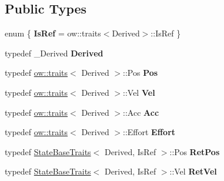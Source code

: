 \subsection*{Public Types}
\begin{DoxyCompactItemize}
\item 
enum \{ {\bfseries Is\+Ref} = ow\+:\+:traits$<$Derived$>$\+:\+:Is\+Ref
 \}\hypertarget{classow__core_1_1StateBase_aebf7bdd308503059430ad3fd25b546e3}{}\label{classow__core_1_1StateBase_aebf7bdd308503059430ad3fd25b546e3}

\item 
typedef \+\_\+\+Derived {\bfseries Derived}\hypertarget{classow__core_1_1StateBase_a7ee88875f85df39f4d6f50bdabda6e25}{}\label{classow__core_1_1StateBase_a7ee88875f85df39f4d6f50bdabda6e25}

\item 
typedef \hyperlink{structow_1_1traits}{ow\+::traits}$<$ Derived $>$\+::Pos {\bfseries Pos}\hypertarget{classow__core_1_1StateBase_aea66b5c23c9391eb5188225c24156c82}{}\label{classow__core_1_1StateBase_aea66b5c23c9391eb5188225c24156c82}

\item 
typedef \hyperlink{structow_1_1traits}{ow\+::traits}$<$ Derived $>$\+::Vel {\bfseries Vel}\hypertarget{classow__core_1_1StateBase_a24e1696806e6418215d232dd25396471}{}\label{classow__core_1_1StateBase_a24e1696806e6418215d232dd25396471}

\item 
typedef \hyperlink{structow_1_1traits}{ow\+::traits}$<$ Derived $>$\+::Acc {\bfseries Acc}\hypertarget{classow__core_1_1StateBase_a1f00d5b78734089abee4367c4bb68567}{}\label{classow__core_1_1StateBase_a1f00d5b78734089abee4367c4bb68567}

\item 
typedef \hyperlink{structow_1_1traits}{ow\+::traits}$<$ Derived $>$\+::Effort {\bfseries Effort}\hypertarget{classow__core_1_1StateBase_a4a41746e434d0dd84ab76aa1a066446b}{}\label{classow__core_1_1StateBase_a4a41746e434d0dd84ab76aa1a066446b}

\item 
typedef \hyperlink{structow__core_1_1StateBaseTraits}{State\+Base\+Traits}$<$ Derived, Is\+Ref $>$\+::Pos {\bfseries Ret\+Pos}\hypertarget{classow__core_1_1StateBase_a38820b67d40304a3028b464da65eda9b}{}\label{classow__core_1_1StateBase_a38820b67d40304a3028b464da65eda9b}

\item 
typedef \hyperlink{structow__core_1_1StateBaseTraits}{State\+Base\+Traits}$<$ Derived, Is\+Ref $>$\+::Vel {\bfseries Ret\+Vel}\hypertarget{classow__core_1_1StateBase_a49dbf477ce1cab4d4387ac8894e75495}{}\label{classow__core_1_1StateBase_a49dbf477ce1cab4d4387ac8894e75495}


\end{DoxyCompactItemize}
